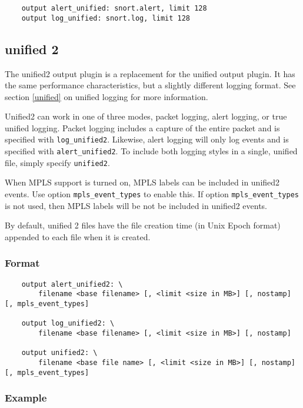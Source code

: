 \documentclass[english]{report}
\newenvironment{note}{
\samepage
    \vspace{10pt}{\textsf{
        {\hspace{7pt}\Huge{$\triangle$\hspace{-12.5pt}{\Large{$^!$}}}}\hspace{5pt}
        {\Large{NOTE}}
    }
    }
   \begin{center}
    \par\vspace{-17pt}

    \begin{lrbox}{\savepar}
    \begin{minipage}[r]{6in}
}
{
    \end{minipage}
    \end{lrbox}
    \fbox{
        \usebox{
            \savepar
	}
    }
    \par\vskip10pt
    \end{center}
}
\newenvironment{note}{
        \begin{rawhtml}
        <p><table border="1"><tr><td><b>
        Note:&nbsp;&nbsp;</b>
        \end{rawhtml}
}{
        \begin{rawhtml}
        </b></td></tr></table></p>
        \end{rawhtml}
}
\begin{document}
\begin{verbatim}
    output alert_unified: snort.alert, limit 128
    output log_unified: snort.log, limit 128
\end{verbatim}

\subsection{unified 2}

The unified2 output plugin is a replacement for the unified output plugin.  It
has the same performance characteristics, but a slightly different logging
format.  See section \ref{unified} on unified logging for more information.

Unified2 can work in one of three modes, packet logging, alert logging, or true
unified logging.  Packet logging includes a capture of the entire packet and is
specified with \texttt{log\_unified2}.  Likewise, alert logging will only log
events and is specified with \texttt{alert\_unified2}.  To include both logging
styles in a single, unified file, simply specify \texttt{unified2}.

When MPLS support is turned on, MPLS labels can be included in unified2 events.
Use option \texttt{mpls\_event\_types} to enable this. If option
\texttt{mpls\_event\_types} is not used, then MPLS labels will be not be
included in unified2 events.

\begin{note}

By default, unified 2 files have the file creation time (in Unix Epoch format)
appended to each file when it is created.  

\end{note}

\subsubsection{Format}

\begin{verbatim}
    output alert_unified2: \
        filename <base filename> [, <limit <size in MB>] [, nostamp] [, mpls_event_types]

    output log_unified2: \
        filename <base filename> [, <limit <size in MB>] [, nostamp]

    output unified2: \
        filename <base file name> [, <limit <size in MB>] [, nostamp] [, mpls_event_types]
\end{verbatim}

\subsubsection{Example}
\end{document}
